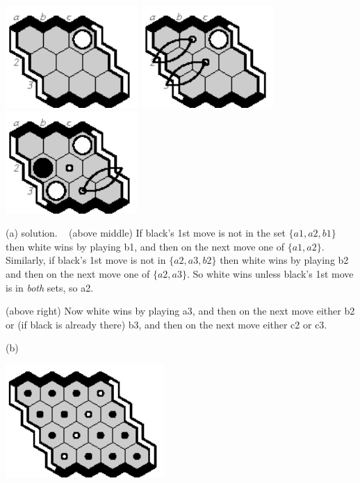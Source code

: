 \documentclass[12pt]{article}
\begin{document}
\newpage
\noindent
\includegraphics[width=50mm]{fz/pix/3strat.eps}\
\includegraphics[width=50mm]{fz/pix/3strat0.eps}\
\includegraphics[width=50mm]{fz/pix/3strat1.eps}
\vfill

(a) solution. ~
(above middle)
If black's 1st move is not in the set $\{a1,a2,b1\}$ then
white wins by playing b1, and then on the next move
one of $\{a1,a2\}$. Similarly, if black's 1st move is not
in $\{a2,a3,b2\}$ then white wins by playing b2
and then on the next move one of $\{a2,a3\}$.
So white wins unless black's 1st move is in {\em both} sets, so a2.
\vfill

(above right)
Now white wins by playing a3, and then on the next move
either b2 or (if black is already there) b3, and then 
on the next move either c2 or c3.
\vfill\vfill

(b)
\begin{center}
\includegraphics[width=60mm]{fz/pix/4x4.winners.eps}\
\end{center}
\vfill
\end{document}
